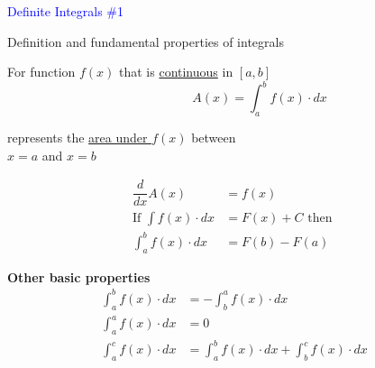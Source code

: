 \documentclass[14pt,fleqn]{extarticle}
\begin{document}
\begin{skill}
\textcolor{blue}{Definite Integrals \#1}

Definition and fundamental properties of integrals 
\end{skill} 

\newcard 

For function $f(x)$ that is \underline{continuous} in $\left[a,b \right]$
\[ \qquad \qquad A(x) = \int_a^b f(x)\cdot dx \]

represents the \underline{area under $f(x)$} between \\$x=a$ and $x=b$

\begin{align}
	\dfrac{d}{dx} A(x) &= f(x) \\ 
	\text{If } \int f(x)\cdot dx &= F(x) + C \text{ then } \\
	\int_a^b f(x)\cdot dx &= F(b) - F(a) 
\end{align}

\textbf{Other basic properties} 
\begin{align}
	\int_a^b f(x)\cdot dx &= -\int_b^a f(x)\cdot dx \\
	\int_a^a f(x)\cdot dx &= 0 \\
	\int_a^c f(x)\cdot dx &= \int_a^b f(x)\cdot dx + \int_b^c f(x)\cdot dx 
\end{align}
\end{document}
